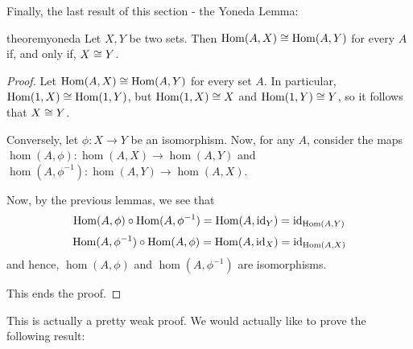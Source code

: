 Finally, the last result of this section - the Yoneda Lemma:

\begin{restatable}{theorem}{yoneda}
	Let $X,Y$ be two sets. Then $\mathrm{Hom}(A,X)\cong\mathrm{Hom}(A,Y)$ for every $A$ if, and only if, $X\cong Y$.
\end{restatable}
\begin{proof}
	Let $\mathrm{Hom}(A,X)\cong \mathrm{Hom}(A,Y)$ for every set $A$. In particular, $\mathrm{Hom}(1,X)\cong\mathrm{Hom}(1,Y)$, but $\mathrm{Hom}(1,X)\cong X$ and $\mathrm{Hom}(1,Y)\cong Y$, so it follows that $X\cong Y$.
	
	\bigskip
	Conversely, let $\phi:X\to Y$ be an isomorphism. Now, for any $A$, consider the maps $\hom(A,\phi):\hom(A,X)\to\hom(A,Y)$ and $\hom(A,\phi^{-1}):\hom(A,Y)\to\hom(A,X)$.
	
	Now, by the previous lemmas, we see that $$\mathrm{Hom}(A,\phi)\circ\mathrm{Hom}(A,\phi^{-1})=\mathrm{Hom}(A,{\rm id}_Y)={\rm id}_{\mathrm{Hom}(A,Y)}$$ $$\mathrm{Hom}(A,\phi^{-1})\circ\mathrm{Hom}(A,\phi)=\mathrm{Hom}(A,{\rm id}_X)={\rm id}_{\mathrm{Hom}(A,X)}$$and hence, $\hom(A,\phi)$ and $\hom(A,\phi^{-1})$ are isomorphisms.
	
	This ends the proof.
\end{proof}

This is actually a pretty weak proof. We would actually like to prove the following result:

